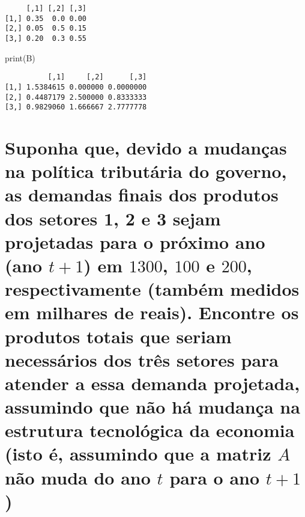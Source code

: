 \documentclass[
  letterpaper,
  DIV=11,
  numbers=noendperiod]{scrreprt}
\newenvironment{Shaded}{\begin{snugshade}}{\end{snugshade}}
\newcommand{\FunctionTok}[1]{\textcolor[rgb]{0.94,0.94,0.56}{#1}}
\newcommand{\NormalTok}[1]{\textcolor[rgb]{0.80,0.80,0.80}{#1}}
\begin{document}
\begin{verbatim}
     [,1] [,2] [,3]
[1,] 0.35  0.0 0.00
[2,] 0.05  0.5 0.15
[3,] 0.20  0.3 0.55
\end{verbatim}

\begin{Shaded}
\begin{Highlighting}[numbers=left,,]
\FunctionTok{print}\NormalTok{(B)}
\end{Highlighting}
\end{Shaded}

\begin{verbatim}
          [,1]     [,2]      [,3]
[1,] 1.5384615 0.000000 0.0000000
[2,] 0.4487179 2.500000 0.8333333
[3,] 0.9829060 1.666667 2.7777778
\end{verbatim}

\section{\texorpdfstring{Suponha que, devido a mudanças na política
tributária do governo, as demandas finais dos produtos dos setores 1, 2
e 3 sejam projetadas para o próximo ano (ano \(t+1\)) em \(1300\),
\(100\) e \(200\), respectivamente (também medidos em milhares de
reais). Encontre os produtos totais que seriam necessários dos três
setores para atender a essa demanda projetada, assumindo que não há
mudança na estrutura tecnológica da economia (isto é, assumindo que a
matriz \(A\) não muda do ano \(t\) para o ano
\(t+1\))}{Suponha que, devido a mudanças na política tributária do governo, as demandas finais dos produtos dos setores 1, 2 e 3 sejam projetadas para o próximo ano (ano t+1) em 1300, 100 e 200, respectivamente (também medidos em milhares de reais). Encontre os produtos totais que seriam necessários dos três setores para atender a essa demanda projetada, assumindo que não há mudança na estrutura tecnológica da economia (isto é, assumindo que a matriz A não muda do ano t para o ano t+1)}}\label{suponha-que-devido-a-mudanuxe7as-na-poluxedtica-tributuxe1ria-do-governo-as-demandas-finais-dos-produtos-dos-setores-1-2-e-3-sejam-projetadas-para-o-pruxf3ximo-ano-ano-t1-em-1300-100-e-200-respectivamente-tambuxe9m-medidos-em-milhares-de-reais.-encontre-os-produtos-totais-que-seriam-necessuxe1rios-dos-truxeas-setores-para-atender-a-essa-demanda-projetada-assumindo-que-nuxe3o-huxe1-mudanuxe7a-na-estrutura-tecnoluxf3gica-da-economia-isto-uxe9-assumindo-que-a-matriz-a-nuxe3o-muda-do-ano-t-para-o-ano-t1}
\end{document}
